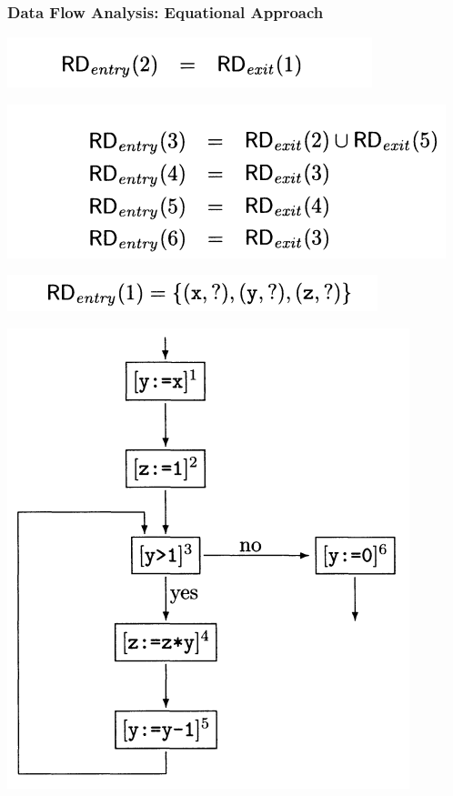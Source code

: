 \documentclass[aspectratio=1610, 13pt]{beamer}
\begin{document}
\begin{frame}\frametitle{Data Flow Analysis: Equational Approach}
\begin{multicols}{2}
\begin{center}

\includegraphics[scale=0.4]{rd_eq2.png}

\includegraphics[scale=0.4]{rd_eq3.png}

\includegraphics[scale=0.4]{rd_eq4.png}
\end{center}
\begin{center}

\includegraphics[scale=0.3]{small_demo.png}
\end{center}
\end{multicols}
\end{frame}
\end{document}
